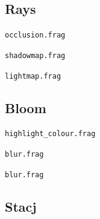\documentclass[../main/main.tex]{subfiles}
\begin{document}
\subsection{Rays}
\noindent\verb|occlusion.frag|


\bigskip
\noindent\verb|shadowmap.frag|


\bigskip
\noindent\verb|lightmap.frag|


\subsection{Bloom}
\noindent\verb|highlight_colour.frag|


\noindent\verb|blur.frag|


\bigskip
\noindent\verb|blur.frag|


\subsection{Stacj}
\end{document}
